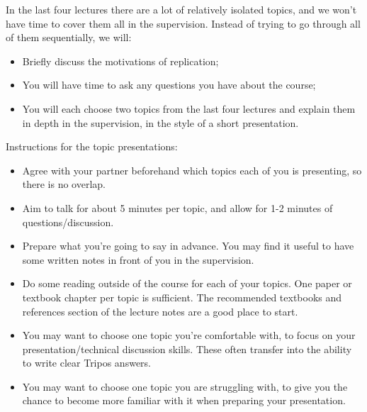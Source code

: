 \documentclass[12pt,a4paper,oneside,openright]{report}
\begin{document}
In the last four lectures there are a lot of relatively isolated
topics, and we won't have time to cover them all in the
supervision. Instead of trying to go through all of them sequentially,
we will:
\begin{itemize}
\item Briefly discuss the motivations of replication;
\item You will have time to ask any questions you have about the
  course;
\item You will each choose two topics from the last four lectures and
  explain them in depth in the supervision, in the style of a short
  presentation.
\end{itemize}

Instructions for the topic presentations:
\begin{itemize}
\item Agree with your partner beforehand which topics each of you is
  presenting, so there is no overlap.
\item Aim to talk for about 5 minutes per topic, and allow for 1-2
  minutes of questions/discussion.
\item Prepare what you're going to say in advance. You may find it
  useful to have some written notes in front of you in the
  supervision.
\item Do some reading outside of the course for each of your
  topics. One paper or textbook chapter per topic is sufficient. The
  recommended textbooks and references section of the lecture notes
  are a good place to start.
\item You may want to choose one topic you're comfortable with, to
  focus on your presentation/technical discussion skills. These often
  transfer into the ability to write clear Tripos answers.
\item You may want to choose one topic you are struggling with, to
  give you the chance to become more familiar with it when preparing
  your presentation.
\end{itemize}
\end{document}
